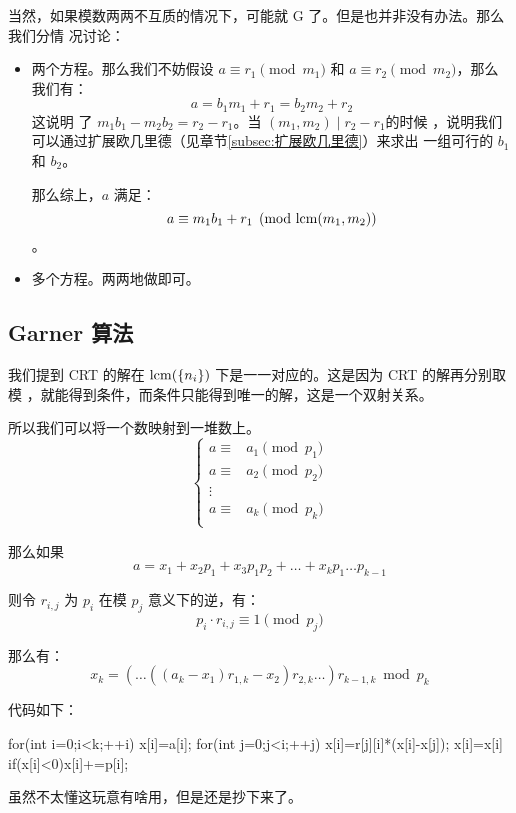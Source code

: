当然，如果模数两两不互质的情况下，可能就 G 了。但是也并非没有办法。那么我们分情
况讨论：
\begin{itemize}
    \item 两个方程。那么我们不妨假设 $a \equiv r_1 \pmod {m_1}$ 和 $a \equiv r_2
        \pmod {m_2}$，那么我们有：\[ a = b_1 m_1 + r_1 = b_2 m_2 + r_2 \]这说明
        了 $m_1 b_1 - m_2 b_2 = r_2 - r_1$。当 $(m_1, m_2) \mid r_2 - r_1$的时候
        ，说明我们可以通过扩展欧几里德（见章节\ref{subsec:扩展欧几里德}）来求出
        一组可行的 $b_1$ 和 $b_2$。

        那么综上，$a$ 满足：\[a \equiv m_1 b_1 + r_1 \pmod{\mathrm{lcm}(m_1, m_2)}\]。
    \item 多个方程。两两地做即可。
\end{itemize}

\subsection{Garner 算法}
我们提到 CRT 的解在 $\mathrm{lcm}(\{n_i\})$ 下是一一对应的。这是因为 CRT 的解再分别取模
，就能得到条件，而条件只能得到唯一的解，这是一个双射关系。

所以我们可以将一个数映射到一堆数上。\[
    \left\{
        \begin{aligned}
            a \equiv{}&{} a_1 \pmod {p_1} \\
            a \equiv{}&{} a_2 \pmod {p_2} \\
              \vdots{}&{} \\
            a \equiv{}&{} a_k \pmod {p_k} \\
        \end{aligned}
    \right.
\]

那么如果\[
a = x_1 + x_2 p_1 + x_3 p_1 p_2 + \ldots + x_k p_1 \ldots p_{k-1}
\]

则令 $r_{i,j}$ 为 $p_i$ 在模 $p_j$ 意义下的逆，有：\[
p_i \cdot r_{i,j} \equiv 1 \pmod{p_j}
\]

那么有：\[
    x_k=(\ldots ((a_k-x_1)r_{1,k}-x_2)r_{2,k} \ldots)r_{k-1,k} \bmod p_k
\]

代码如下：
\begin{Cpp}
for(int i=0;i<k;++i) {
  x[i]=a[i];
  for(int j=0;j<i;++j) {
    x[i]=r[j][i]*(x[i]-x[j]);
    x[i]=x[i]%
    if(x[i]<0)x[i]+=p[i];
  }
}
\end{Cpp}

虽然不太懂这玩意有啥用，但是还是抄下来了。
